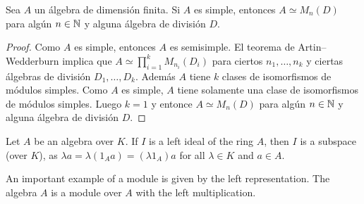 %
%
\begin{theorem}[Wedderburn]
	Sea $A$ un álgebra de dimensión finita. 
	Si $A$ es simple, entonces $A\simeq M_n(D)$ para algún $n\in\mathbb{N}$ y alguna álgebra de división $D$.
\end{theorem}


\begin{proof}
	Como $A$ es simple, entonces $A$ es semisimple. El teorema de Artin--Wedderburn implica que $A\simeq\prod_{i=1}^k M_{n_i}(D_i)$ 
	para ciertos $n_1,\dots,n_k$ y ciertas álgebras de división $D_1,\dots,D_k$. Además $A$ tiene
	$k$ clases de isomorfismos de módulos simples. Como $A$ es simple,
	$A$ tiene solamente una clase de isomorfismos de módulos simples. Luego $k=1$ y entonce
	$A\simeq M_n(D)$ para algún $n\in\mathbb{N}$ y alguna álgebra de división $D$. 
\end{proof}








Let $A$ be an algebra over $K$. If $I$ is a left ideal of the ring $A$, then 
$I$ is a subspace (over $K$), as $\lambda a=\lambda(1_Aa)=(\lambda 1_A)a$ 
for all $\lambda\in K$ and $a\in A$.  



An important example of a module is given by the left representation. The 
algebra $A$ is a module over $A$ with the left multiplication. 

